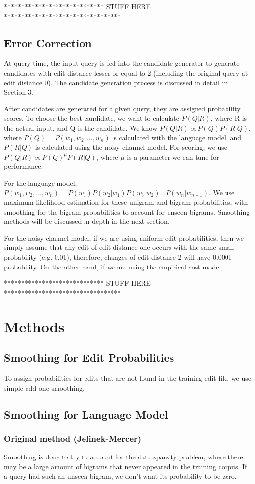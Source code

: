 \documentclass[10pt]{article}
\begin{document}
***************************** STUFF HERE **********************************
\subsection{Error Correction}
At query time, the input query is fed into the candidate generator to generate candidates with edit distance lesser or equal to 2 (including the original query at edit distance 0). The candidate generation process is discussed in detail in Section 3.

After candidates are generated for a given query, they are assigned probability scores. To choose the best candidate, we want to calculate $P(Q|R)$, where R is the actual input, and Q is the candidate. We know $P(Q|R)\propto P(Q)P(R|Q)$, where $P(Q)=P(w_1,w_2,\dots,w_n)$ is calculated with the language model, and $P(R|Q)$ is calculated using the noisy channel model. For scoring, we use $P(Q|R)\propto P(Q)^\mu P(R|Q)$, where $\mu$ is a parameter we can tune for performance.

For the language model, $P(w_1,w_2,\dots,w_n)=P(w_1)P(w_2|w_1)P(w_3|w_2)\dots P(w_n|w_{n-1})$. We use maximum likelihood estimation for these unigram and bigram probabilities, with smoothing for the bigram probabilities to account for unseen bigrams. Smoothing methods will be discussed in depth in the next section.

For the noisy channel model, if we are using uniform edit probabilities, then we simply assume that any edit of edit distance one occurs with the same small probability (e.g. 0.01), therefore, changes of edit distance 2 will have 0.0001 probability. On the other hand, if we are using the empirical cost model, 

***************************** STUFF HERE **********************************
\section{Methods}
\subsection{Smoothing for Edit Probabilities}
To assign probabilities for edits that are not found in the training edit file, we use simple add-one smoothing. 
\subsection{Smoothing for Language Model}
\subsubsection{Original method (Jelinek-Mercer)}
Smoothing is done to try to account for the data sparsity problem, where there may be a large amount of bigrams that never appeared in the training corpus. If a query had such an unseen bigram, we don't want its probability to be zero.
\end{document}
